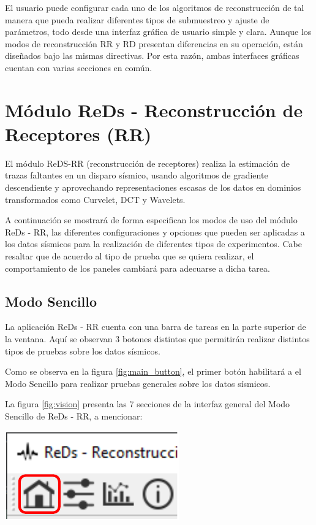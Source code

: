 \documentclass[12pt,twoside,letter]{ol-softwaremanual}
\newenvironment{Figure}
  {\par\medskip\noindent\minipage{\linewidth}}
  {\endminipage\par\medskip}
\begin{document}
El usuario puede configurar cada uno de los algoritmos de reconstrucción de tal manera que pueda realizar diferentes tipos de submuestreo y ajuste de parámetros, todo desde una interfaz gráfica de usuario simple y clara. Aunque los modos de reconstrucción RR y RD presentan diferencias en su operación, están diseñados bajo las mismas directivas. Por esta razón, ambas interfaces gráficas cuentan con varias secciones en común.



\newpage
\section{Módulo ReDs - Reconstrucción de Receptores (RR)}

El módulo ReDS-RR (reconstrucción de receptores) realiza la estimación de trazas faltantes en un disparo sísmico, usando algoritmos de gradiente descendiente y aprovechando representaciones escasas de los datos en dominios transformados como Curvelet, DCT y Wavelets.

A continuación se mostrará de forma especifican los modos de uso del módulo ReDs - RR, las diferentes configuraciones y opciones que pueden ser aplicadas a los datos sísmicos para la realización de diferentes tipos de experimentos. Cabe resaltar que de acuerdo al tipo de prueba que se quiera realizar, el comportamiento de los paneles cambiará para adecuarse a dicha tarea.

\subsection{Modo Sencillo}

La aplicación ReDs - RR cuenta con una barra de tareas en la parte superior de la ventana. Aquí se observan 3 botones distintos que permitirán realizar distintos tipos de pruebas sobre los datos sísmicos.

\begin{multicols}{2}
	
	Como se observa en la figura \ref{fig:main_button}, el primer botón habilitará a el Modo Sencillo para realizar pruebas generales sobre los datos sísmicos.
	
	La figura \ref{fig:vision} presenta las 7 secciones de la interfaz general del Modo Sencillo de ReDs - RR, a mencionar:
	
	\begin{Figure}
		\centering
		\includegraphics[width=0.5\linewidth]{single-tab}
		\label{fig:main_button}
	\end{Figure}
	
\end{multicols}
\end{document}
